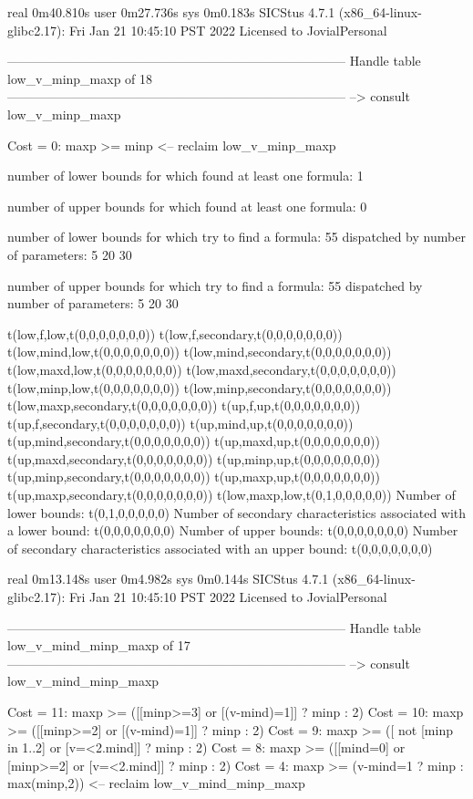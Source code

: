 real	0m40.810s
user	0m27.736s
sys	0m0.183s
SICStus 4.7.1 (x86_64-linux-glibc2.17): Fri Jan 21 10:45:10 PST 2022
Licensed to JovialPersonal


--------------------------------------------------------------------------------
Handle table low_v_minp_maxp of 18
--------------------------------------------------------------------------------
--> consult low_v_minp_maxp

Cost =  0:  maxp >= minp
<-- reclaim low_v_minp_maxp

number of lower bounds for which found at least one formula: 1

number of upper bounds for which found at least one formula: 0

number of lower bounds for which try to find a formula: 55
dispatched by number of parameters: 5  20  30

number of upper bounds for which try to find a formula: 55
dispatched by number of parameters: 5  20  30

t(low,f,low,t(0,0,0,0,0,0,0))
t(low,f,secondary,t(0,0,0,0,0,0,0))
t(low,mind,low,t(0,0,0,0,0,0,0))
t(low,mind,secondary,t(0,0,0,0,0,0,0))
t(low,maxd,low,t(0,0,0,0,0,0,0))
t(low,maxd,secondary,t(0,0,0,0,0,0,0))
t(low,minp,low,t(0,0,0,0,0,0,0))
t(low,minp,secondary,t(0,0,0,0,0,0,0))
t(low,maxp,secondary,t(0,0,0,0,0,0,0))
t(up,f,up,t(0,0,0,0,0,0,0))
t(up,f,secondary,t(0,0,0,0,0,0,0))
t(up,mind,up,t(0,0,0,0,0,0,0))
t(up,mind,secondary,t(0,0,0,0,0,0,0))
t(up,maxd,up,t(0,0,0,0,0,0,0))
t(up,maxd,secondary,t(0,0,0,0,0,0,0))
t(up,minp,up,t(0,0,0,0,0,0,0))
t(up,minp,secondary,t(0,0,0,0,0,0,0))
t(up,maxp,up,t(0,0,0,0,0,0,0))
t(up,maxp,secondary,t(0,0,0,0,0,0,0))
t(low,maxp,low,t(0,1,0,0,0,0,0))
Number of lower bounds:                                             t(0,1,0,0,0,0,0)
Number of secondary characteristics associated with a lower bound:  t(0,0,0,0,0,0,0)
Number of upper bounds:                                             t(0,0,0,0,0,0,0)
Number of secondary characteristics associated with an upper bound: t(0,0,0,0,0,0,0)

real	0m13.148s
user	0m4.982s
sys	0m0.144s
SICStus 4.7.1 (x86_64-linux-glibc2.17): Fri Jan 21 10:45:10 PST 2022
Licensed to JovialPersonal


--------------------------------------------------------------------------------
Handle table low_v_mind_minp_maxp of 17
--------------------------------------------------------------------------------
--> consult low_v_mind_minp_maxp

Cost = 11:  maxp >= ([[minp>=3] or [(v-mind)=1]] ? minp : 2)
Cost = 10:  maxp >= ([[minp>=2] or [(v-mind)=1]] ? minp : 2)
Cost =  9:  maxp >= ([ not [minp in 1..2] or [v=<2.mind]] ? minp : 2)
Cost =  8:  maxp >= ([[mind=0] or [minp>=2] or [v=<2.mind]] ? minp : 2)
Cost =  4:  maxp >= (v-mind=1 ? minp : max(minp,2))
<-- reclaim low_v_mind_minp_maxp

